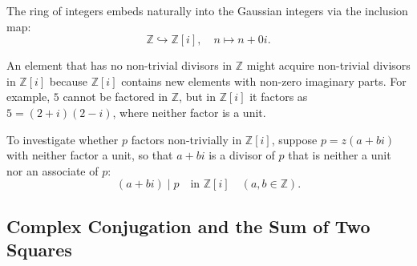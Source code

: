 \begin{content}
The ring of integers embeds naturally into the Gaussian integers via the inclusion map:
\[
\mathbb{Z} \hookrightarrow \mathbb{Z}[i], \quad n \mapsto n + 0i.
\]


\begin{steps}
An element that has no non-trivial divisors in $\mathbb{Z}$ might acquire non-trivial divisors in $\mathbb{Z}[i]$ because $\mathbb{Z}[i]$ contains new elements with non-zero imaginary parts. For example, $5$ cannot be factored in $\mathbb{Z}$, but in $\mathbb{Z}[i]$ it factors as $5 = (2 + i)(2 - i)$, where neither factor is a unit.
\end{steps}

\par\vspace{1ex}\noindent
To investigate whether $p$ factors non-trivially in $\mathbb{Z}[i]$, suppose $p = z (a + bi)$ with neither factor a unit, so that $a + bi$ is a divisor of $p$ that is neither a unit nor an associate of $p$:
\begin{equation}\label{eq:gaussian-divisor}
(a + bi) \mid p \quad \text{in } \mathbb{Z}[i] \quad (a, b \in \mathbb{Z}).
\end{equation}
\end{content}

\subsection{Complex Conjugation and the Sum of Two Squares}

